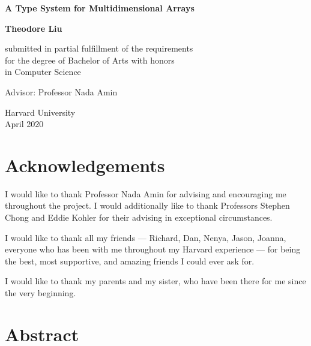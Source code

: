 \documentclass[12pt]{report}
\begin{document}
\begin{titlepage}
   \begin{center}
       \vspace*{1cm}

       \vfill
       {\large\textbf{A Type System for Multidimensional Arrays}}


       \vspace{1.5cm}

       \textbf{Theodore Liu}

       \vspace{1.5cm}

       submitted in partial fulfillment of the requirements \\
       for the degree of Bachelor of Arts with honors \\
       in Computer Science

       \vspace{1.5cm}

       Advisor: Professor Nada Amin

       \vspace{0.8cm}


       Harvard University\\
       April 2020

       \vfill
       \vspace*{1cm}
   \end{center}
\end{titlepage}

\chapter*{Acknowledgements}

I would like to thank Professor Nada Amin for advising and encouraging me throughout the project. I would additionally like to thank Professors Stephen Chong and Eddie Kohler for their advising in exceptional circumstances.

I would like to thank all my friends --- Richard, Dan, Nenya, Jason, Joanna, everyone who has been with me throughout my Harvard experience --- for being the best, most supportive, and amazing friends I could ever ask for.

I would like to thank my parents and my sister, who have been there for me since the very beginning.

\chapter*{Abstract}
\end{document}
